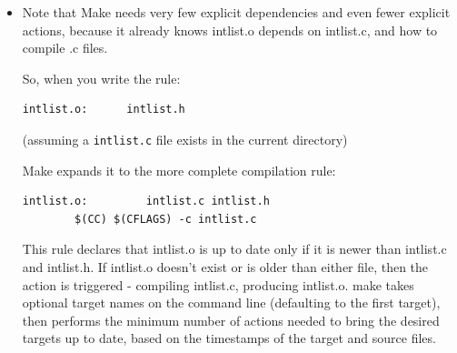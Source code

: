 \documentclass[handout]{beamer}
\begin{document}
\begin{frame}[fragile]

\begin{itemize}
      \item
	Note that Make needs very few explicit dependencies and even fewer explicit actions,
	because it already knows \alert{intlist.o} depends on \alert{intlist.c},
	and how to compile \alert{.c} files. %

      \pitem
      So, when you write the rule:
\begin{verbatim}
intlist.o:      intlist.h
\end{verbatim}

      (assuming a \verb+intlist.c+ file exists in the current directory)

      \pause
      Make expands it to the more complete compilation rule:

\begin{verbatim}
intlist.o:         intlist.c intlist.h
        $(CC) $(CFLAGS) -c intlist.c
\end{verbatim}

      \pitem
	This rule declares that \alert{intlist.o} is up
	to date only if it is \alert{newer than intlist.c and intlist.h}.
	If \alert{intlist.o doesn't exist} or \alert{is older than either file},
	then the action is triggered - compiling \alert{intlist.c}, producing \alert{intlist.o}.
      \pitem
        \alert{make} takes optional target names on the command line
	(defaulting to the first target),
        then performs the \alert{minimum number of actions}
	needed to bring the desired targets \alert{up to date},
	based on the \alert{timestamps} of the target and source files.
	
%

\end{itemize}

\end{frame}
\end{document}

